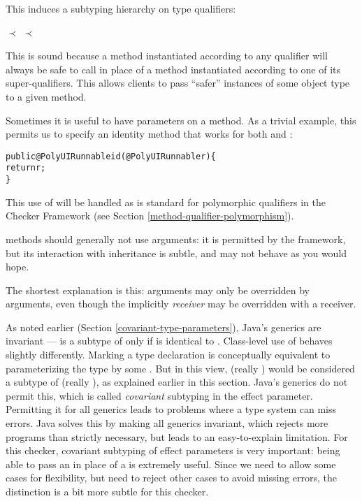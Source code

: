 This induces a subtyping hierarchy on type qualifiers:

\centerline{ $\prec$  $\prec$ }

\noindent
This is sound because a method instantiated according to any qualifier will always be
safe to call in place of a method instantiated according to one of its super-qualifiers.
This allows clients to pass ``safer'' instances of some object type to a given method.



Sometimes it is useful to have  parameters on a method.  As a trivial example, this
permits us to specify an identity method that works for both  and
:

\begin{alltt}
public @PolyUI Runnable id(@PolyUI Runnable r) \{
    return r;
\}
\end{alltt}

\noindent
This use of  will be handled as is standard for polymorphic qualifiers in the Checker
Framework (see Section \ref{method-qualifier-polymorphism}).

 methods should generally not use  arguments: it is permitted by
the framework, but its interaction with inheritance is subtle, and may not behave as you would
hope.

The shortest explanation is this:  arguments may only be overridden by 
arguments, even though the implicitly  \emph{receiver} may be overridden with a
 receiver.

As noted earlier (Section \ref{covariant-type-parameters}), Java's generics are invariant ---
 is a subtype of  only if  is identical to .
Class-level use of  behaves slightly differently.
Marking a type declaration  is conceptually
equivalent to parameterizing the type by some .  But in this view,
 (really ) would be considered a subtype of
 (really ), as explained earlier in this section.  Java's
generics do not permit this, which is called \emph{covariant} subtyping in the effect parameter.
Permitting it for all generics leads to problems where a type system can miss errors.  Java solves
this by making all generics invariant, which rejects more programs than strictly necessary, but
leads to an easy-to-explain limitation.  For this checker, covariant subtyping of effect parameters
is very important: being able to pass an  in place of a  is extremely useful.  Since we need to allow some
cases for flexibility, but need to reject other cases to avoid missing errors, the distinction is a
bit more subtle for this checker.


